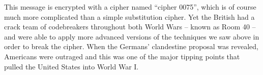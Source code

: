 \documentclass[UTF8]{book}
\begin{document}
\begin{CJK}{UTF8}{gbsn}
This message is encrypted with a cipher named ``cipher 0075'', which is of course much more complicated than a simple substitution cipher. Yet the British had a crack team of codebreakers throughout both World Wars – known as Room 40 – and were able to apply more advanced versions of the techniques we saw above in order to break the cipher. When the Germans' clandestine proposal was revealed, Americans were outraged and this was one of the major tipping points that pulled the United States into World War I.

\end{CJK}
\end{document}
